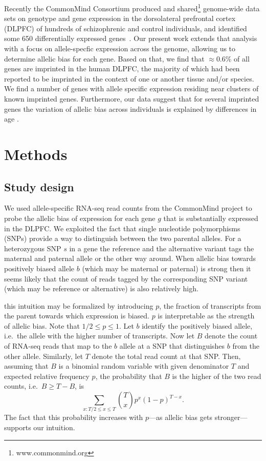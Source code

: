 \documentclass[12pt,letterpaper]{article}
\begin{document}
Recently the CommonMind Consortium produced and
shared\footnote{www.commonmind.org} genome-wide data sets on genotype and gene
expression in the dorsolateral prefrontal cortex (DLPFC) of hundreds of
schizophrenic and control individuals, and identified some 650 differentially
expressed genes~\cite{Fromer2016a}. Our present work extends that analysis
with a focus on allele-specfic expression across the genome, allowing us to
determine allelic bias for each gene.  Based on that, we find that \(\approx
0.6\%\) of all genes are imprinted in the human DLPFC, the majority of which
had been reported to be imprinted in the context of one or another tissue
and/or species. We find a number of genes with allele specific expression
residing near clusters of known imprinted genes. Furthermore, our data suggest
that for several imprinted genes the variation of allelic bias across
individuals is explained by differences in  age .

\section{Methods}

\subsection{Study design}

We used allele-specific RNA-seq read counts from the CommonMind project to
probe the allelic bias of expression for each gene \(g\) that is
substantially expressed in the DLPFC.  We exploited the fact that single
nucleotide polymorphisms (SNPs) provide a way to distinguish between the two
parental alleles.  For a heterozygous SNP \(s\) in a gene the reference and the
alternative variant tags the maternal and paternal allele or the other way
around.  When allelic bias towards positively biased allele \(b\) (which may
be maternal or paternal) is strong then it seems likely that the count of
reads tagged by the corresponding SNP variant (which may be reference or
alternative) is also relatively high.

this intuition may be formalized by introducing \(p\), the fraction of
transcripts from the parent towards which expression is biased.  \(p\) is
interpretable as the strength of allelic bias.  Note that \(1/2\le p\le 1\).
Let \(b\) identify the positively biased allele, i.e.~the allele with the
higher number of transcripts.  Now let \(B\) denote the count of RNA-seq reads
that map to the \(b\) allele at a SNP that distinguishes \(b\) from the other
allele.  Similarly, let \(T\) denote the total read count at that SNP.  Then,
assuming that \(B\) is a binomial random variable with given denominator \(T\)
and expected relative frequency \(p\), the probability that \(B\) is the
higher of the two read counts, i.e.~\(B \ge T - B\), is \[\sum_{x:T/2\le x\le
T} {T \choose x} p^x (1 - p)^{T-x}.\] The fact that this probability increases
with \(p\)---as allelic bias gets stronger---supports our intuition.
\end{document}
